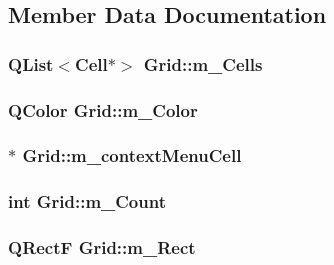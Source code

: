 \subsection{Member Data Documentation}
\hypertarget{class_grid_aaf84bbdf05031d68d75d1d65fbe04e7a}{
\subsubsection[{m\_\-Cells}]{\setlength{\rightskip}{0pt plus 5cm}QList$<${\bf Cell}$\ast$$>$ {\bf Grid::m\_\-Cells}}}
\label{class_grid_aaf84bbdf05031d68d75d1d65fbe04e7a}
\hypertarget{class_grid_a7f0e55832f709aa7522f7bab9f1de483}{
\subsubsection[{m\_\-Color}]{\setlength{\rightskip}{0pt plus 5cm}QColor {\bf Grid::m\_\-Color}}}
\label{class_grid_a7f0e55832f709aa7522f7bab9f1de483}
\hypertarget{class_grid_a5e6033513c06c44da6a6bcc753502c25}{
\subsubsection[{m\_\-contextMenuCell}]{$\ast$ {\bf Grid::m\_\-contextMenuCell}}}
\label{class_grid_a5e6033513c06c44da6a6bcc753502c25}
\hypertarget{class_grid_a7df62a4d6f80b779c1ffebd645ea8d2c}{
\subsubsection[{m\_\-Count}]{\setlength{\rightskip}{0pt plus 5cm}int {\bf Grid::m\_\-Count}}}
\label{class_grid_a7df62a4d6f80b779c1ffebd645ea8d2c}
\hypertarget{class_grid_a3af909c8dfab0cb7454edeedec81341b}{
\subsubsection[{m\_\-Rect}]{\setlength{\rightskip}{0pt plus 5cm}QRectF {\bf Grid::m\_\-Rect}}}
